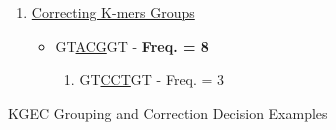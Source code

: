 \documentclass[12pt,openany]{llncs}
\begin{document}
\begin{figure}
\begin{bordered}
\begin{enumerate}
	\begin{itemize}
		\item 
	Hence, one group is formed \textit{assuming weakest 3 nucleotides of GTACGGT are the three middles}
		\begin{enumerate}
		\item GT\underline{A}\underline{C}\underline{G}GT - \textbf{Freq. = 8}
		\item GT\underline{C}\underline{C}\underline{T}GT - Freq. = 3
		\end{enumerate}
	\end{itemize}
	\item \underline{Correcting K-mers Groups}
	\begin{itemize}
		\item GT\underline{A}\underline{C}\underline{G}GT - \textbf{Freq. = 8}
		\begin{enumerate}
		\item GT\underline{C}\underline{C}\underline{T}GT - Freq. = 3
		\end{enumerate}
	\end{itemize}
\end{enumerate}
\end{bordered}
\caption{\label{fig:fig-KGEC-EX}KGEC Grouping and Correction Decision Examples}
\end{figure}
\end{document}
